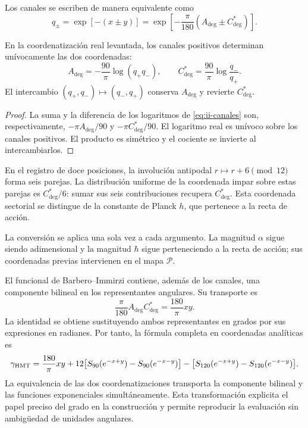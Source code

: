 Los canales se escriben de manera equivalente como
\begin{equation}
 q_\pm=\exp[-(x\pm y)]
 =\exp\!\left[-\frac{\pi}{180}(A_{\deg}\pm C^*_{\deg})\right].
\label{eq:ii-canales}
\end{equation}
\begin{proposition}
\label{prop:ii-inversion-canales-angulares}
En la coordenatización real levantada, los canales positivos determinan
unívocamente las dos coordenadas:
\[
 A_{\deg}=-\frac{90}{\pi}\log(q_+q_-),\qquad
 C^*_{\deg}=\frac{90}{\pi}\log\frac{q_-}{q_+}.
\]
El intercambio \((q_+,q_-)\mapsto(q_-,q_+)\) conserva
\(A_{\deg}\) y revierte \(C^*_{\deg}\).
\end{proposition}
\begin{proof}
La suma y la diferencia de los logaritmos de
\eqref{eq:ii-canales} son, respectivamente,
\(-\pi A_{\deg}/90\) y \(-\pi C^*_{\deg}/90\).
El logaritmo real es unívoco sobre los canales positivos.
El producto es simétrico y el cociente se invierte al intercambiarlos.
\end{proof}
En el registro de doce posiciones, la involución antipodal
\(r\mapsto r+6\pmod {12}\) forma seis parejas. La distribución
uniforme de la coordenada impar sobre estas parejas es
\(C^*_{\deg}/6\): sumar sus seis contribuciones recupera
\(C^*_{\deg}\). Esta coordenada sectorial se distingue de
la constante de Planck \(h\), que pertenece a la recta de acción.

La conversión se aplica una sola vez a cada argumento. La magnitud
\(\alpha\) sigue siendo adimensional y la magnitud \(\hbar\)
sigue perteneciendo a la recta de acción; sus coordenadas previas
intervienen en el mapa \(\mathcal P\).

El funcional de Barbero--Immirzi contiene, además de los canales, una
componente bilineal en los representantes angulares. Su transporte es
\begin{equation}
 \frac{\pi}{180}A_{\deg}C^*_{\deg}
 =\frac{180}{\pi}xy.
 \label{eq:ii-barbero-cartas}
\end{equation}
La identidad se obtiene sustituyendo ambos representantes en grados
por sus expresiones en radianes. Por tanto, la fórmula completa en
coordenadas analíticas es
\[
 \gamma_{\mathrm{HMT}}
 =\frac{180}{\pi}xy
 +12\bigl[S_{90}(e^{-x+y})-S_{90}(e^{-x-y})\bigr]
 -\bigl[S_{120}(e^{-x+y})-S_{120}(e^{-x-y})\bigr].
\]
La equivalencia de las dos coordenatizaciones transporta la componente bilineal
y las funciones exponenciales simultáneamente. Esta transformación
explicita el papel preciso del grado en la construcción y permite
reproducir la evaluación sin ambigüedad de unidades angulares.
